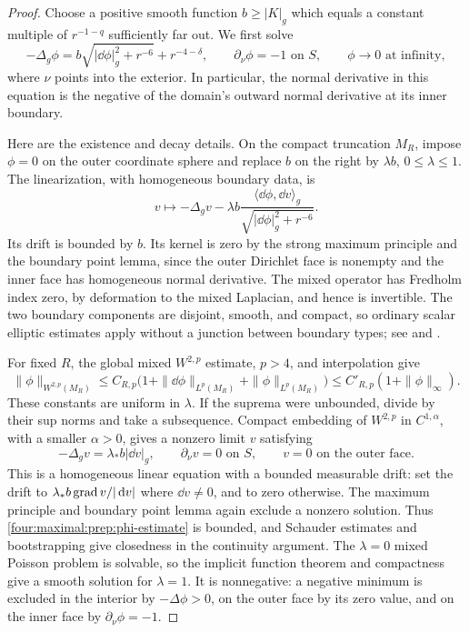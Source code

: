 \begin{proof}
Choose a positive smooth function \(b\ge|K|_g\) which equals a
constant multiple of \(r^{-1-q}\) sufficiently far out.  We first solve
\begin{equation}
 -\Delta_g\phi
   =b\sqrt{|\dd\phi|_g^2+r^{-6}}+r^{-4-\delta},
 \qquad \partial_\nu\phi=-1\text{ on }S,
 \qquad \phi\longrightarrow0\text{ at infinity},
\label{four:maximal:prep:phi-equation}
\end{equation}
where \(\nu\) points into the exterior.  In particular, the normal
derivative in this equation is the negative of the domain's outward
normal derivative at its inner boundary.

Here are the existence and decay details.  On the compact truncation
\(M_R\), impose \(\phi=0\) on the outer coordinate sphere and replace
\(b\) on the right by \(\lambda b\), \(0\le\lambda\le1\).
The linearization, with homogeneous boundary data, is
\[
 v\longmapsto-\Delta_gv
 -\lambda b\frac{\langle\dd\phi,\dd v\rangle_g}
                        {\sqrt{|\dd\phi|_g^2+r^{-6}}}.
\]
Its drift is bounded by \(b\).  Its kernel is zero by the strong
maximum principle and the boundary point lemma, since the outer
Dirichlet face is nonempty and the inner face has homogeneous normal
derivative.  The mixed operator has Fredholm index zero, by deformation
to the mixed Laplacian, and hence is invertible.  The two boundary
components are disjoint, smooth, and compact, so ordinary scalar
elliptic estimates apply without a junction between boundary types;
see \cite[Chapters~3, 6, and~9]{GilbargTrudinger2001} and
\cite[Theorems~7.3 and~15.2--15.3]{AgmonDouglisNirenberg1959}.

For fixed \(R\), the global mixed \(W^{2,p}\) estimate, \(p>4\),
and interpolation give
\begin{equation}
 \|\phi\|_{W^{2,p}(M_R)}
 \le C_{R,p}\bigl(1+\|\dd\phi\|_{L^p(M_R)}
                         +\|\phi\|_{L^p(M_R)}\bigr)
 \le C'_{R,p}(1+\|\phi\|_\infty).
\label{four:maximal:prep:phi-estimate}
\end{equation}
These constants are uniform in \(\lambda\).  If the suprema were
unbounded, divide by their sup norms and take a subsequence.  Compact
embedding of \(W^{2,p}\) in \(C^{1,\alpha}\), with a smaller
\(\alpha>0\), gives a nonzero limit \(v\) satisfying
\[
 -\Delta_gv=\lambda_*b|\dd v|_g,
 \qquad \partial_\nu v=0\text{ on }S,
 \qquad v=0\text{ on the outer face}.
\]
This is a homogeneous linear equation with a bounded measurable drift:
set the drift to \(\lambda_*b\operatorname{grad} v/|\,\mathrm d v|\) where
\(\dd v\ne0\), and to zero otherwise.  The maximum principle and
boundary point lemma again exclude a nonzero solution.  Thus
\eqref{four:maximal:prep:phi-estimate} is bounded, and Schauder estimates and
bootstrapping give closedness in the continuity argument.  The
\(\lambda=0\) mixed Poisson problem is solvable, so the implicit
function theorem and compactness give a smooth solution for
\(\lambda=1\).  It is nonnegative: a negative minimum is excluded
in the interior by \(-\Delta\phi>0\), on the outer face by its
zero value, and on the inner face by \(\partial_\nu\phi=-1\).


\end{proof}
